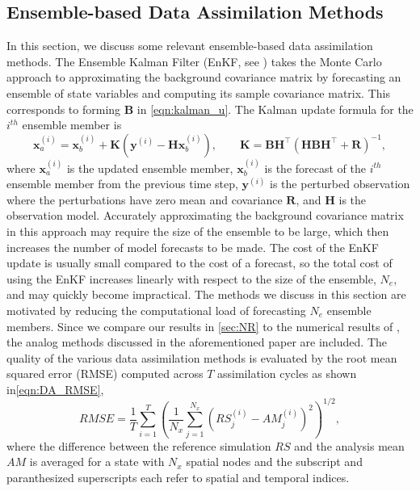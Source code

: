 \documentclass[final,3p]{elsarticle}
\theoremstyle{break}
\newcommand{\bb}[1]{\mathbf{#1}}
\begin{document}
\subsection{Ensemble-based Data Assimilation Methods}
\label{sec:DA}
In this section, we discuss some relevant ensemble-based data assimilation methods.
The Ensemble Kalman Filter (EnKF, see \cite{Evensen1994,houtekamer1998data,burgers1998analysis}) takes the Monte Carlo approach to approximating the background covariance matrix by forecasting an ensemble of state variables and computing its sample covariance matrix.
This corresponds to forming $\bb{B}$ in \cref{eqn:kalman_u}.
The Kalman update formula for the $i^{th}$ ensemble member is
\begin{equation}
\bb{x}_{a}^{(i)} = \bb{x}_b^{(i)} + \bb{K}(\bb{y}^{(i)}-\bb{H}\bb{x}_b^{(i)}),\qquad \bb{K}=\bb{BH}^{\top}(\bb{HBH}^{\top}+\bb{R})^{-1},\label{eqn:kalman_u}
\end{equation}
where $\bb{x}_a^{(i)}$ is the updated ensemble member, $\bb{x}_b^{(i)}$ is the forecast of the $i^{th}$ ensemble member from the previous time step, $\bb{y}^{(i)}$ is the perturbed observation where the perturbations have zero mean and covariance $\bb{R}$, and $\bb{H}$ is the observation model.
Accurately approximating the background covariance matrix in this approach may require the size of the ensemble to be large, which then increases the number of model forecasts to be made. 
The cost of the EnKF update is usually small compared to the cost of a forecast, so the total cost of using the EnKF increases linearly with respect to the size of the ensemble, $N_e$, and may quickly become impractical.
The methods we discuss in this section are motivated by reducing the computational load of forecasting $N_e$ ensemble members. 
Since we compare our results in \cref{sec:NR} to the numerical results of \cite{grooms2020analog}, the analog methods discussed in the aforementioned paper are included.
The quality of the various data assimilation methods is evaluated by the root mean squared error (RMSE) computed across $T$ assimilation cycles as shown in\cref{eqn:DA_RMSE},
\begin{equation}
\label{eqn:DA_RMSE}
RMSE = \frac{1}{T}\sum_{i=1}^T \left(\frac{1}{N_x}\sum_{j=1}^{N_x} \left(RS_j^{(i)}-AM_j^{(i)}\right)^2\right)^{1/2},
\end{equation}
where the difference between the reference simulation $RS$ and the analysis mean $AM$ is averaged for a state with $N_x$ spatial nodes and the subscript and paranthesized superscripts each refer to spatial and temporal indices.
\end{document}
